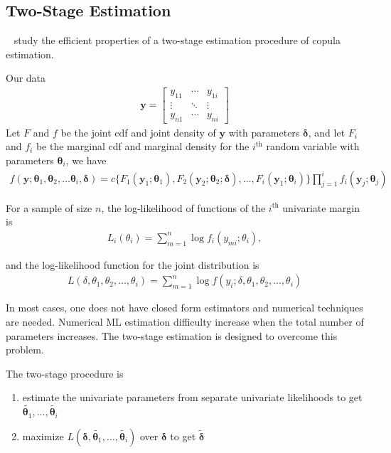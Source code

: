 

\subsection{Two-Stage Estimation}\label{subsec:two-stage-estimation}
~\cite{joe2005asymptotic} study the efficient properties of a two-stage estimation procedure of copula estimation.

Our data
\begin{align}
    \pmb{y} = \begin{bmatrix}
                  y_{11} & \cdots & y_{1i}\\
                  \vdots & \ddots & \vdots \\
                  y_{n1} & \cdots & y_{ni}
                  \end{bmatrix}
    \end{align}
Let $F$ and $f$ be the joint cdf and joint density of $\pmb{y}$ with parameters $\pmb{\delta}$,
and let $F_i$ and $f_i$ be the marginal cdf and marginal density for the $i^\text{th}$ random variable with parameters $\pmb{\theta}_i$, we have
\begin{align}
    f(\pmb{y}; \pmb{\theta}_1, \pmb{\theta}_2,\dots \pmb{\theta}_i, \pmb{\delta}) =
    c\{F_1(\pmb{y}_1;\pmb{\theta}_1), F_2(\pmb{y}_2; \pmb{\theta}_2; \pmb{\delta}), \dots, F_i(\pmb{y}_1;\pmb{\theta}_i)\}
    \prod^i_{j=1}f_i(\pmb{y}_j;\pmb{\theta}_j)
    \end{align}

For a sample of size $n$, the log-likelihood of functions of the $i^\text{th}$ univariate margin is
\begin{align}
    L_i(\theta_i) = \sum^n_{m=1} \log f_i(y_{mi}; \theta_i),
    \end{align}

and the log-likelihood function for the joint distribution is
\begin{align}
    L(\delta, \theta_1, \theta_2, \dots, \theta_i) = \sum^n_{m=1} \log f(y_i; \delta, \theta_1, \theta_2, ..., \theta_i)
    \end{align}

In most cases, one does not have closed form estimators and numerical techniques are needed.
Numerical ML estimation difficulty increase when the total number of parameters increases.
The two-stage estimation is designed to overcome this problem.

The two-stage procedure is
\begin{enumerate}
    \item estimate the univariate parameters from separate univariate likelihoods to get $\tilde{\pmb{\theta}_1}, ..., \tilde{\pmb{\theta}_i}$
    \item maximize $L(\pmb{\delta}, \tilde{\pmb{\theta}_1}, \dots, \tilde{\pmb{\theta}_i})$ over $\pmb{\delta}$ to get $\tilde{\pmb{\delta}}$
    \end{enumerate}

